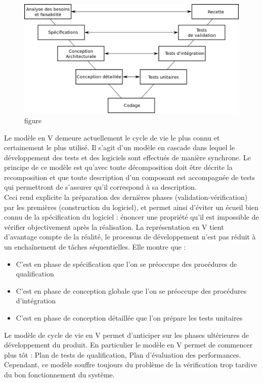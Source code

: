 \begin{figure} [H]
\centering
\includegraphics[scale=0.5]{images/cycle}
\caption{figure}
\end{figure}
Le modèle en V demeure actuellement le cycle de vie le plus connu et certainement le plus utilisé. Il s’agit d’un modèle en cascade dans lequel le développement des tests et des logiciels sont effectués de manière synchrone.
Le principe de ce modèle est qu’avec toute décomposition doit être décrite la recomposition et que toute description d’un composant est accompagnée de tests qui permettront de s’assurer qu’il correspond à sa description.\\
Ceci rend explicite la préparation des dernières phases (validation-vérification) par les premières (construction du logiciel), et permet ainsi d’éviter un écueil bien connu de la spécification du logiciel : énoncer une propriété qu’il est impossible de vérifier objectivement après la réalisation.
La représentation en V tient d’avantage compte de la réalité, le processus de développement n’est pas réduit à un enchaînement de tâches séquentielles. Elle montre que :
\begin{itemize}
	\item C’est en phase de spécification que l’on se préoccupe des procédures de qualification
	\item C’est en phase de conception globale que l’on se préoccupe des procédures d’intégration
	\item C’est en phase de conception détaillée que l’on prépare les tests unitaires
\end{itemize}

Le modèle de cycle de vie en V permet d’anticiper sur les phases ultérieures de développement du produit. En particulier le modèle en V permet de commencer plus tôt : Plan de tests de qualification, Plan d’évaluation des performances. Cependant, ce modèle souffre toujours du problème de la vérification trop tardive du bon fonctionnement du système.
